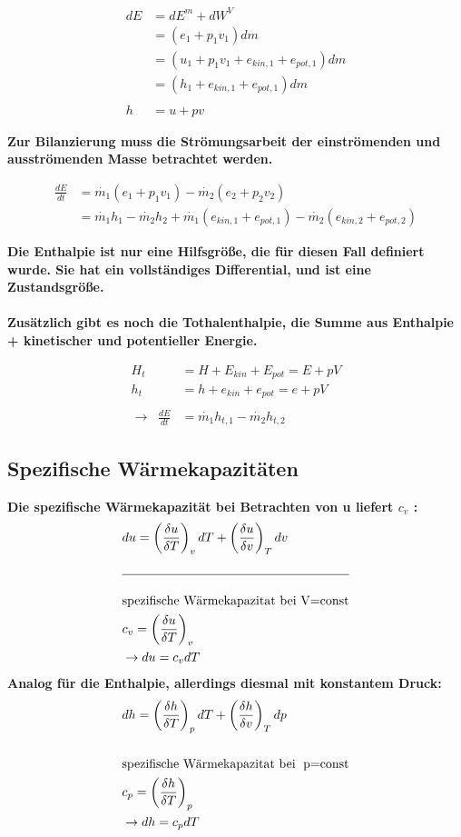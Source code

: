\documentclass[12pt]{article}
\begin{document}
\begin{align*}
dE &= dE^m + dW^V\\
&=(e_1+p_1v_1)dm\\
&=(u_1 +p_1v_1 +e_{kin,1}+e_{pot,1})dm\\
&=(h_1+e_{kin,1}+e_{pot,1})dm\\\\
h&=u+pv
\end{align*}

\begin{tcolorbox}[colback=backblue,colframe=borderblue,title=Important]
\textbf{Zur Bilanzierung muss die Strömungsarbeit der einströmenden und ausströmenden Masse betrachtet werden.}

\begin{align*}
\frac{dE}{dt}&=\dot{m_1}(e_1+p_1v_1)-\dot{m_2}(e_2+p_2v_2)\\
&=\dot{m_1}h_1-\dot{m_2}h_2+\dot{m_1}(e_{kin,1}+e_{pot,1})-\dot{m_2}(e_{kin,2}+e_{pot,2})
\end{align*}
\end{tcolorbox}
\textbf{Die Enthalpie ist nur eine Hilfsgröße, die für diesen Fall definiert wurde. Sie hat ein vollständiges Differential, und ist eine Zustandsgröße.
\\ \\
Zusätzlich gibt es noch die Tothalenthalpie, die Summe aus Enthalpie + kinetischer und potentieller Energie.}

\begin{align*}
H_t&=H+E_{kin}+E_{pot}=E+pV \\
h_t&=h+e_{kin}+e_{pot}=e+pV \\ \\
\rightarrow  \; \; \frac{dE}{dt}&=\dot{m_1}h_{t,1}-\dot{m_2}h_{t,2}
\end{align*}

\subsection{Spezifische Wärmekapazitäten}
\bigskip
\textbf{Die spezifische Wärmekapazität bei Betrachten von u liefert $c_v$ :}
\begin{align*}
&du=\left(\frac{\delta u}{\delta T}\right)_v dT + \left(\frac{\delta u}{\delta v}\right)_Tdv \\ \\
\hline \\
&\text{spezifische Wärmekapazitat bei V=const}\\
&c_v=\left(\frac{\delta u}{\delta T}\right)_v \\
&\rightarrow du=c_vdT
\end{align*}
\bigskip
\textbf{Analog für die Enthalpie, allerdings diesmal mit konstantem Druck:}
\begin{align*}
&dh=\left(\frac{\delta h}{\delta T}\right)_p dT + \left(\frac{\delta h}{\delta v}\right)_Tdp \\ \\
&\text{spezifische Wärmekapazitat bei\; p=const}\\
&c_p=\left(\frac{\delta h}{\delta T}\right)_p \\
&\rightarrow dh=c_pdT
\end{align*}
\pagebreak
\end{document}

